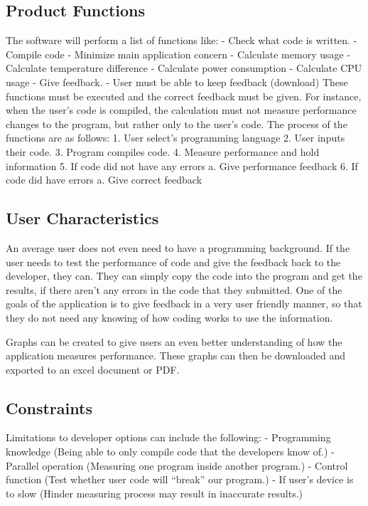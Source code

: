 \documentclass[a4paper,12pt]{article}
\begin{document}
\subsection{Product Functions}
The software will perform a list of functions like:
-	Check what code is written.
-	Compile code
-	Minimize main application concern
-	Calculate memory usage
-	Calculate temperature difference
-	Calculate power consumption
-	Calculate CPU usage
-	Give feedback.
-	User must be able to keep feedback (download)
These functions must be executed and the correct feedback must be given. For instance, when the user’s code is compiled, the calculation must not measure performance changes to the program, but rather only to the user’s code. 
The process of the functions are as follows:
1.	User select’s programming language
2.	User inputs their code.
3.	Program compiles code.
4.	Measure performance and hold information
5.	If code did not have any errors
a.	Give performance feedback
6.	If code did have errors
a.	Give correct feedback

\subsection{User Characteristics}
An average user does not even need to have a programming background. If the user needs to test the performance of code and give the feedback back to the developer, they can. They can simply copy the code into the program and get the results, if there aren’t any errors in the code that they submitted. One of the goals of the application is to give feedback in a very user friendly manner, so that they do not need any knowing of how coding works to use the information. 

Graphs can be created to give users an even better understanding of how the application measures performance. These graphs can then be downloaded and exported to an excel document or PDF. 

\subsection{Constraints}
Limitations to developer options can include the following:
-	Programming knowledge (Being able to only compile code that the developers know of.)
-	Parallel operation (Measuring one program inside another program.)
-	Control function (Test whether user code will “break” our program.)
-	If user’s device is to slow (Hinder measuring process may result in inaccurate results.)
\end{document}
